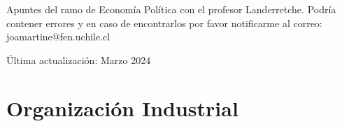 \documentclass[12pt]{book}
\begin{document}
Apuntes del ramo de Economía Política con el profesor Landerretche. Podría contener errores y en caso de encontrarlos por favor notificarme al correo: joamartine@fen.uchile.cl

Última actualización: Marzo 2024

\newpage

\setcounter{chapter}{3}

\chapter{Organización Industrial}





\begin{appendices}
    
\end{appendices}
\end{document}

